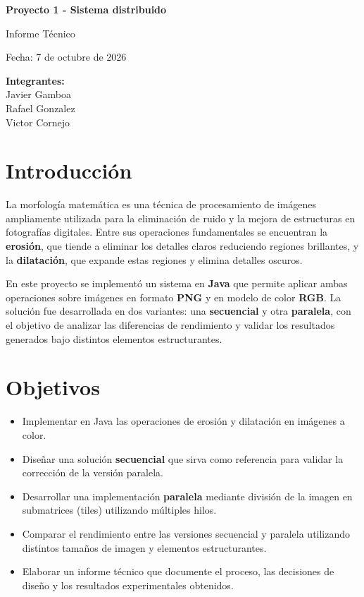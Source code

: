 \documentclass[a4paper,12pt]{article}
\begin{document}
\begin{titlepage}
    \centering
    \vspace*{3cm}
    {\Huge\bfseries Proyecto 1 - Sistema distribuido \par}
    \vspace{2cm}
    {\Large Informe Técnico \par}
    \vspace{2cm}
    {\large Fecha: 7 de octubre de 2026 \par}
    \vspace{2cm}
    {\large
        \textbf{Integrantes:} \\
        Javier Gamboa \\
        Rafael Gonzalez \\
        Victor Cornejo
    }
    \vfill
\end{titlepage}

\tableofcontents
\newpage

\section{Introducción}
La morfología matemática es una técnica de procesamiento de imágenes ampliamente utilizada
para la eliminación de ruido y la mejora de estructuras en fotografías digitales.
Entre sus operaciones fundamentales se encuentran la \textbf{erosión}, que tiende a eliminar
los detalles claros reduciendo regiones brillantes, y la \textbf{dilatación}, que expande
estas regiones y elimina detalles oscuros.

En este proyecto se implementó un sistema en \textbf{Java} que permite aplicar ambas
operaciones sobre imágenes en formato \textbf{PNG} y en modelo de color \textbf{RGB}.
La solución fue desarrollada en dos variantes: una \textbf{secuencial} y otra
\textbf{paralela}, con el objetivo de analizar las diferencias de rendimiento y validar
los resultados generados bajo distintos elementos estructurantes.

\section{Objetivos}
\begin{itemize}
    \item Implementar en Java las operaciones de erosión y dilatación en imágenes a color.
    \item Diseñar una solución \textbf{secuencial} que sirva como referencia para validar
    la corrección de la versión paralela.
    \item Desarrollar una implementación \textbf{paralela} mediante división de la imagen
    en submatrices (tiles) utilizando múltiples hilos.
    \item Comparar el rendimiento entre las versiones secuencial y paralela utilizando
    distintos tamaños de imagen y elementos estructurantes.
    \item Elaborar un informe técnico que documente el proceso, las decisiones de diseño
    y los resultados experimentales obtenidos.
\end{itemize}
\end{document}
